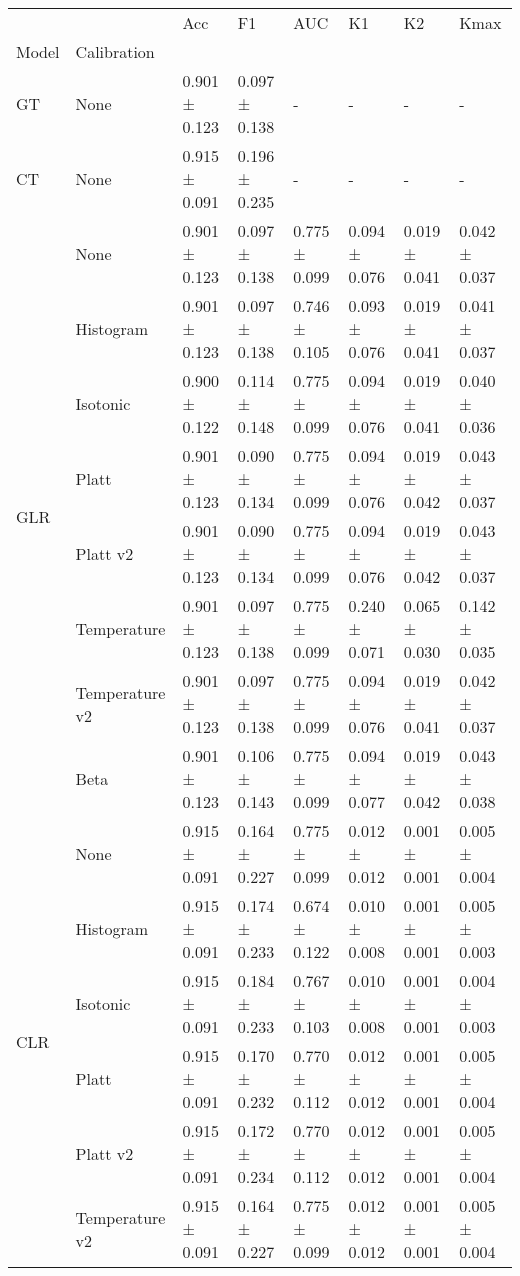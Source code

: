 \begin{tabular}{llllllll}
\toprule
 &  & Acc & F1 & AUC & K1 & K2 & Kmax \\
Model & Calibration &  &  &  &  &  &  \\
\midrule
GT & None & 0.901 ± 0.123 & 0.097 ± 0.138 & - & - & - & - \\
\cline{1-8}
CT & None & 0.915 ± 0.091 & 0.196 ± 0.235 & - & - & - & - \\
\cline{1-8}
\multirow[t]{8}{*}{GLR} & None & 0.901 ± 0.123 & 0.097 ± 0.138 & 0.775 ± 0.099 & 0.094 ± 0.076 & 0.019 ± 0.041 & 0.042 ± 0.037 \\
 & Histogram & 0.901 ± 0.123 & 0.097 ± 0.138 & 0.746 ± 0.105 & 0.093 ± 0.076 & 0.019 ± 0.041 & 0.041 ± 0.037 \\
 & Isotonic & 0.900 ± 0.122 & 0.114 ± 0.148 & 0.775 ± 0.099 & 0.094 ± 0.076 & 0.019 ± 0.041 & 0.040 ± 0.036 \\
 & Platt & 0.901 ± 0.123 & 0.090 ± 0.134 & 0.775 ± 0.099 & 0.094 ± 0.076 & 0.019 ± 0.042 & 0.043 ± 0.037 \\
 & Platt v2 & 0.901 ± 0.123 & 0.090 ± 0.134 & 0.775 ± 0.099 & 0.094 ± 0.076 & 0.019 ± 0.042 & 0.043 ± 0.037 \\
 & Temperature & 0.901 ± 0.123 & 0.097 ± 0.138 & 0.775 ± 0.099 & 0.240 ± 0.071 & 0.065 ± 0.030 & 0.142 ± 0.035 \\
 & Temperature v2 & 0.901 ± 0.123 & 0.097 ± 0.138 & 0.775 ± 0.099 & 0.094 ± 0.076 & 0.019 ± 0.041 & 0.042 ± 0.037 \\
 & Beta & 0.901 ± 0.123 & 0.106 ± 0.143 & 0.775 ± 0.099 & 0.094 ± 0.077 & 0.019 ± 0.042 & 0.043 ± 0.038 \\
\cline{1-8}
\multirow[t]{7}{*}{CLR} & None & 0.915 ± 0.091 & 0.164 ± 0.227 & 0.775 ± 0.099 & 0.012 ± 0.012 & 0.001 ± 0.001 & 0.005 ± 0.004 \\
 & Histogram & 0.915 ± 0.091 & 0.174 ± 0.233 & 0.674 ± 0.122 & 0.010 ± 0.008 & 0.001 ± 0.001 & 0.005 ± 0.003 \\
 & Isotonic & 0.915 ± 0.091 & 0.184 ± 0.233 & 0.767 ± 0.103 & 0.010 ± 0.008 & 0.001 ± 0.001 & 0.004 ± 0.003 \\
 & Platt & 0.915 ± 0.091 & 0.170 ± 0.232 & 0.770 ± 0.112 & 0.012 ± 0.012 & 0.001 ± 0.001 & 0.005 ± 0.004 \\
 & Platt v2 & 0.915 ± 0.091 & 0.172 ± 0.234 & 0.770 ± 0.112 & 0.012 ± 0.012 & 0.001 ± 0.001 & 0.005 ± 0.004 \\
 & Temperature v2 & 0.915 ± 0.091 & 0.164 ± 0.227 & 0.775 ± 0.099 & 0.012 ± 0.012 & 0.001 ± 0.001 & 0.005 ± 0.004 \\

\end{tabular}
